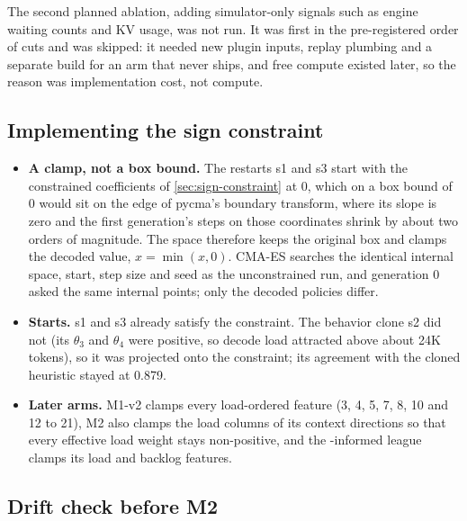 The second planned ablation, adding simulator-only signals such as engine waiting counts and KV
usage, was not run. It was first in the pre-registered order of cuts and was skipped: it needed new
plugin inputs, replay plumbing and a separate build for an arm that never ships, and free compute
existed later, so the reason was implementation cost, not compute.

\subsection{Implementing the sign constraint}

\begin{itemize}
  \item \textbf{A clamp, not a box bound.} The restarts s1 and s3 start with the constrained
    coefficients of \cref{sec:sign-constraint} at 0, which on a box bound of 0 would sit on the
    edge of pycma's boundary transform, where its slope is zero and the first generation's steps on
    those coordinates shrink by about two orders of magnitude. The space therefore keeps the
    original box and clamps the decoded value, $x = \min(x, 0)$. CMA-ES searches the identical
    internal space, start, step size and seed as the unconstrained run, and generation 0 asked the
    same internal points; only the decoded policies differ.
  \item \textbf{Starts.} s1 and s3 already satisfy the constraint. The behavior clone s2 did not
    (its $\theta_3$ and $\theta_4$ were positive, so decode load attracted above about 24K tokens),
    so it was projected onto the constraint; its agreement with the cloned heuristic stayed at 0.879.
  \item \textbf{Later arms.} M1-v2 clamps every load-ordered feature (3, 4, 5, 7, 8, 10 and 12 to
    21), M2 also clamps the load columns of its context directions so that every effective load
    weight stays non-positive, and the \ais{}-informed league clamps its load and backlog features.
\end{itemize}

\subsection{Drift check before M2}
\label{sec:drift}

